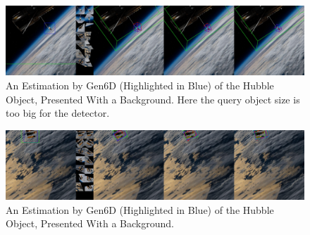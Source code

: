\begin{figure}[ht]
  \centering
  \includegraphics[width=\textwidth]{data/res4.jpg}
  \caption{An Estimation by Gen6D (Highlighted in Blue) of the Hubble Object, Presented With a Background. Here the query object size is too big for the detector.}
  \label{fig:cap4}
\end{figure}

\begin{figure}[ht]
  \centering
  \includegraphics[width=\textwidth]{data/res1.jpg}
  \caption{An Estimation by Gen6D (Highlighted in Blue) of the Hubble Object, Presented With a Background.}
  \label{fig:cap2}
\end{figure}

\cleardoublepage{}